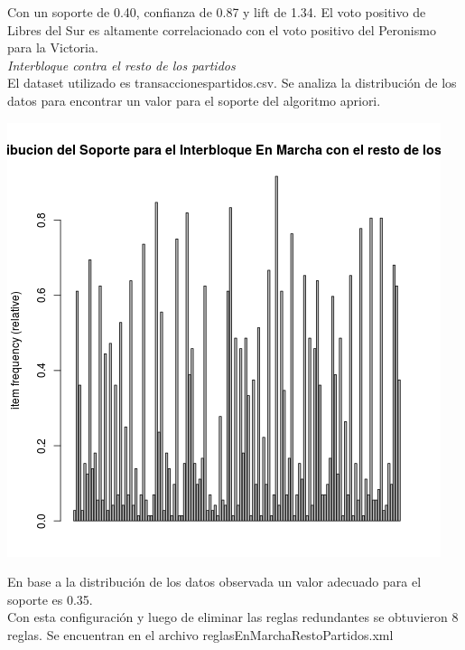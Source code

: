 \documentclass{endm}
\begin{document}
Con un soporte de 0.40, confianza de 0.87 y lift de 1.34. El voto positivo de Libres del Sur es altamente correlacionado con el voto positivo del Peronismo para la Victoria. \\

\textit{Interbloque contra el resto de los partidos} \\

El dataset utilizado es transaccionespartidos.csv. Se analiza la distribución de los datos para encontrar un valor para el soporte del algoritmo apriori. \\

\begin{center}
\includegraphics[scale=0.4]{graficos/soportesEnMarchaPartidosRestoPartidos.png}
\end{center}

En base a la distribución de los datos observada un valor adecuado para el soporte es 0.35. \\

Con esta configuración y luego de eliminar las reglas redundantes se obtuvieron 8 reglas. Se encuentran en el archivo reglasEnMarchaRestoPartidos.xml  \\
\end{document}
